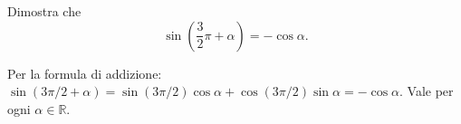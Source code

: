 
\begin{esercizio}
Dimostra che
    \[
        \sin\left(\frac{3}{2}\pi+\alpha\right)=-\cos\alpha.
    \]
\end{esercizio}

\begin{soluzione}
Per la formula di addizione:
$\sin(3\pi/2+\alpha)=\sin(3\pi/2)\cos\alpha+\cos(3\pi/2)\sin\alpha
=-\cos\alpha$. Vale per ogni $\alpha\in\mathbb R$.
\end{soluzione}
